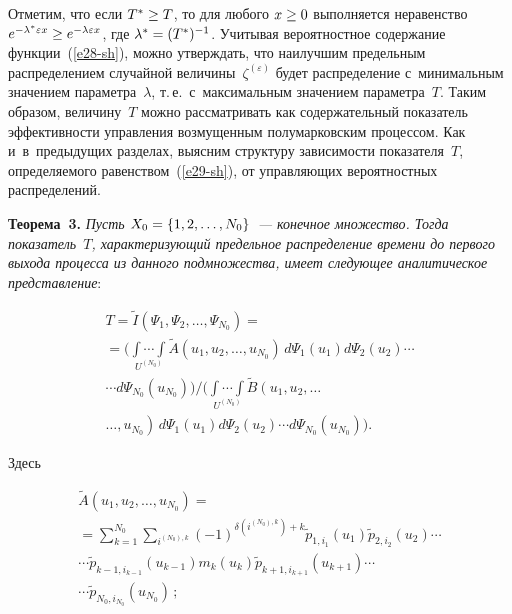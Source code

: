 \begin{multicols}{2}
Отметим, что если $T^{*} \hm\geq T$, то для любого $x\hm\geq 0$ выполняется 
неравенство $e^{-\lambda ^{*} \varepsilon x} \hm\geq e^{-\lambda \varepsilon x} $, 
где $\lambda^{*} \hm=(T^{*} )^{-1} $. Учитывая вероятностное содержание функции~(\ref{e28-sh}), 
мож\-но утверж\-дать, что наилучшим предельным распределением случайной 
величины~$\zeta^{(\varepsilon)}$ будет распределение с~минимальным значением 
параметра~$\lambda$, т.\,е.\ с~максимальным значением па\-ра\-мет\-ра~$T$. Таким 
образом, величину~$T$ можно рас\-смат\-ри\-вать как содержательный показатель 
эффективности управ\-ле\-ния возмущенным полумарковским процессом. Как и~в~предыду\-щих 
разделах, выясним структуру зависимости показателя~$T$, опре\-де\-ля\-емо\-го 
равенством~(\ref{e29-sh}), от управ\-ля\-ющих вероятностных распределений.

\smallskip

\noindent
\textbf{Теорема~3.} \textit{Пусть $X_{0}\hm =\{1,2,\dots, N_0\}$~--- конечное 
множество. Тогда показатель~$T$, характеризующий предельное распределение 
времени до первого выхода процесса из данного подмножества, имеет сле\-ду\-ющее 
аналитическое представление}:

\vspace*{-4pt}

\noindent
\begin{multline}
T=\tilde{I}\left(\Psi_{1}, \Psi_{2}, \ldots , \Psi_{N_0} 
\right)={}\\
{}=\!\Bigg(\underset{U^{(N_0)}}{\int\! \cdots\! \int}\tilde{A} \left(u_{1} ,u_{2} ,\ldots ,u_{N_0} 
\right)\,d\Psi_{1} (u_{1})d\Psi_{2} (u_{2} )\cdots\\[-2pt]
\cdots d\Psi_{N_0} \left(u_{N_0} \right)  \Bigg)\!\!\Bigg/\!\!
\Bigg(\underset{U^{(N_0)}}{\int \!\cdots\! \int}\tilde{B}\left(u_{1} ,u_{2} ,\ldots\right.\\
\left.\ldots ,u_{N_0} 
\right)\,d\Psi_{1} (u_{1} )d\Psi_{2} (u_{2} )\cdots d\Psi_{N_0} (u_{N_0}) \Bigg). 
\label{e30-sh}
\end{multline}

\vspace*{-8pt}

\noindent
Здесь

\vspace*{-6pt}

\noindent
\begin{multline}
\tilde{A}(u_{1} ,u_{2} ,\ldots ,u_{N_0} )={}\\
{}=\sum\limits_{k=1}^{N_0} 
 \sum\limits_{i^{(N_0),k} } (-1)^{\delta (i^{(N_0),k} )+k}  
\tilde{p}_{1,i_{1} } (u_{1})\tilde{p}_{2,i_{2} } (u_{2} )\cdots\\
\cdots 
\tilde{p}_{k-1,i_{k-1} } (u_{k-1} )m_{k} (u_{k} )\tilde{p}_{k+1,i_{k+1} } 
(u_{k+1} )\cdots\\
\cdots \tilde{p}_{N_0,i_{N_0} } (u_{N_0} )\,;
\label{e31-sh}
\end{multline}


\end{multicols}
